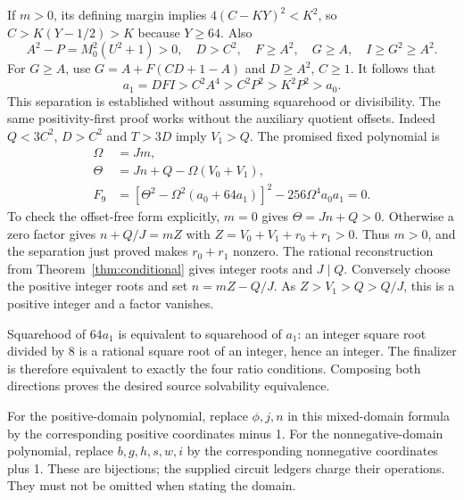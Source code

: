 If $m>0$, its defining margin implies $4(C-KY)^2<K^2$, so
$C>K(Y-1/2)>K$ because $Y\ge64$. Also
\[
 A^2-P=M_0^2(U^2+1)>0,\quad D>C^2,\quad F\ge A^2,\quad
 G\ge A,\quad I\ge G^2\ge A^2.
\]
For $G\ge A$, use $G=A+F(CD+1-A)$ and $D\ge A^2$, $C\ge1$.
It follows that
\[
 a_1=DFI>C^2A^4>C^2P^2>K^2P^2>a_0.
\]
This separation is established without assuming squarehood or divisibility.
The same positivity-first proof works without the auxiliary quotient offsets.
Indeed $Q<3C^2$, $D>C^2$ and $T>3D$ imply $V_1>Q$.
The promised fixed polynomial is
\begin{align*}
 \Omega&=Jm,\\
 \Theta&=Jn+Q-\Omega(V_0+V_1),\\
 F_9&=[\Theta^2-\Omega^2(a_0+64a_1)]^2
                   -256\Omega^4a_0a_1=0.
\end{align*}
To check the offset-free form explicitly, $m=0$ gives $\Theta=Jn+Q>0$.
Otherwise a zero factor gives $n+Q/J=mZ$ with
$Z=V_0+V_1+r_0+r_1>0$. Thus $m>0$, and the separation just proved
makes $r_0+r_1$ nonzero. The rational reconstruction from
Theorem~\ref{thm:conditional} gives integer roots and $J\mid Q$.
Conversely choose the positive integer roots and set $n=mZ-Q/J$.
As $Z>V_1>Q>Q/J$, this is a positive integer and a factor vanishes.

Squarehood of $64a_1$ is equivalent to squarehood of $a_1$: an integer
square root divided by 8 is a rational square root of an integer, hence
an integer. The finalizer is therefore equivalent to exactly the four
ratio conditions. Composing both directions proves the desired source
solvability equivalence.

For the positive-domain polynomial, replace $\phi,j,n$ in this mixed-domain
formula by the corresponding positive coordinates minus 1. For the
nonnegative-domain polynomial, replace $b,g,h,s,w,i$ by the corresponding
nonnegative coordinates plus 1. These are bijections; the supplied circuit
ledgers charge their operations. They must not be omitted when stating the
domain.

